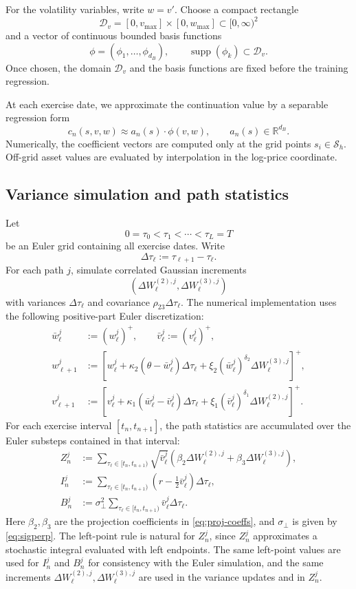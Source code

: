 \documentclass[pdflatex,sn-mathphys-num]{sn-jnl}
\theoremstyle{thmstyleone}%
\theoremstyle{thmstylethree}%
\theoremstyle{thmstyletwo}%
\newcommand{\R}{\mathbb R}
\providecommand{\supp}{\operatorname{supp}}
\begin{document}
For the volatility variables, write $w=v'$. Choose a compact rectangle
$$
\mathcal D_v=[0,v_{\max}]\times[0,w_{\max}]\subset[0,\infty)^2
$$
and a vector of continuous bounded basis functions
$$
\phi=(\phi_1,\ldots,\phi_{d_B}),
\qquad
\supp(\phi_k)\subset \mathcal D_v.
$$
Once chosen, the domain $\mathcal D_v$ and the basis functions are fixed before
the training regression.

At each exercise date, we approximate the continuation value by a separable
regression form
$$
c_n(s,v,w)\approx a_n(s)\cdot\phi(v,w),
\qquad
a_n(s)\in\R^{d_B}.
$$
Numerically, the coefficient vectors are computed only at the grid points
$s_i\in\mathcal S_h$. Off-grid asset values are evaluated by interpolation in the
log-price coordinate.

\subsection{Variance simulation and path statistics}
Let
$$
0=\tau_0<\tau_1<\cdots<\tau_L=T
$$
be an Euler grid containing all exercise dates. Write
$$
\Delta\tau_\ell:=\tau_{\ell+1}-\tau_\ell.
$$
For each path $j$, simulate correlated Gaussian increments
$$
(\Delta W_{\ell}^{(2),j},\Delta W_{\ell}^{(3),j})
$$
with variances $\Delta\tau_\ell$ and covariance
$\rho_{23}\Delta\tau_\ell$. The numerical implementation uses the following
positive-part Euler discretization:
$$
\begin{aligned}
\bar w_\ell^j&:=(w_\ell^j)^+,
\qquad
\bar v_\ell^j:=(v_\ell^j)^+,\\
w_{\ell+1}^j
&:=
\left[
w_\ell^j+\kappa_2(\theta-\bar w_\ell^j)\Delta\tau_\ell
+\xi_2(\bar w_\ell^j)^{\delta_2}\Delta W_{\ell}^{(3),j}
\right]^+,\\
v_{\ell+1}^j
&:=
\left[
v_\ell^j+\kappa_1(\bar w_\ell^j-\bar v_\ell^j)\Delta\tau_\ell
+\xi_1(\bar v_\ell^j)^{\delta_1}\Delta W_{\ell}^{(2),j}
\right]^+.
\end{aligned}
$$
For each exercise interval $[t_n,t_{n+1}]$, the path statistics are accumulated
over the Euler substeps contained in that interval:
$$
\begin{aligned}
Z_n^j
&:=
\sum_{\tau_\ell\in[t_n,t_{n+1})}
\sqrt{\bar v_\ell^j}
\left(
\beta_2\Delta W_{\ell}^{(2),j}
+
\beta_3\Delta W_{\ell}^{(3),j}
\right),\\
I_n^j
&:=
\sum_{\tau_\ell\in[t_n,t_{n+1})}
\left(r-\frac12\bar v_\ell^j\right)\Delta\tau_\ell,\\
B_n^j
&:=
\sigma_\perp^2
\sum_{\tau_\ell\in[t_n,t_{n+1})}
\bar v_\ell^j\Delta\tau_\ell .
\end{aligned}
$$
Here $\beta_2,\beta_3$ are the projection coefficients in
\eqref{eq:proj-coeffs}, and $\sigma_\perp$ is given by \eqref{eq:sigperp}.
The left-point rule is natural for $Z_n^j$, since $Z_n^j$ approximates a
stochastic integral evaluated with left endpoints. The same left-point values
are used for $I_n^j$ and $B_n^j$ for consistency with the Euler simulation, and
the same increments
$\Delta W_{\ell}^{(2),j},\Delta W_{\ell}^{(3),j}$ are used in the variance
updates and in $Z_n^j$.
\end{document}
